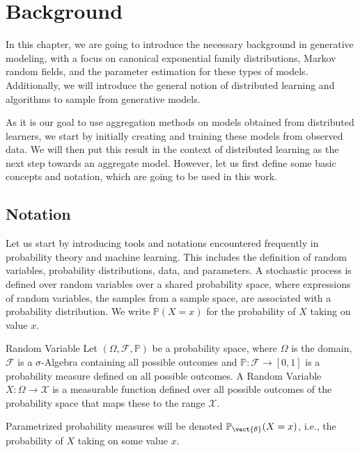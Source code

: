 \chapter{Background}
\label{chapter:kap2}
In this chapter, we are going to introduce the necessary background in generative modeling, with a focus on canonical exponential family distributions, Markov random fields, and the parameter estimation for these types of models.
Additionally, we will introduce the general notion of distributed learning and algorithms to sample from generative models.

As it is our goal to use aggregation methods on models obtained from distributed learners, we start by initially creating and training these models from observed data. 
We will then put this result in the context of distributed learning as the next step towards an aggregate model.
However, let us first define some basic concepts and notation, which are going to be used in this work.


\section{Notation}
    \label{sec:nota}
    Let us start by introducing tools and notations encountered frequently in probability theory and machine learning.
    This includes the definition of random variables, probability distributions, data, and parameters.
    A stochastic process is defined over random variables over a shared probability space, where expressions of random variables, the samples from a sample space, are associated with a probability distribution. 
    We write $\mathbb{P}(X = x)$ for the probability of $X$ taking on value $x$.
    \begin{definition}{Random Variable}
        \label{def:randvar}
        Let $(\Omega, \mathcal{F}, \mathbb{P})$ be a probability space, where $\Omega$ is the domain, $\mathcal{F}$ is a $\sigma$-Algebra containing all possible outcomes and $\mathbb{P}: \mathcal{F} \rightarrow [0,1]$ is a probability measure defined on all possible outcomes.
        A Random Variable $X: \Omega \rightarrow \mathcal{X}$ is a measurable function defined over all possible outcomes of the probability space that maps these to the range $\mathcal{X}$.

        Parametrized probability measures will be denoted $\mathbb{P}_{\vect{\theta}} (X = x)$, i.e., the probability of $X$ taking on some value $x$.
    \end{definition}


